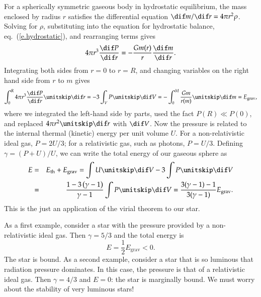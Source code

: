 For a spherically symmetric gaseous body in hydrostatic equilibrium, the mass enclosed by radius $r$ satisfies the differential equation $\dif m/\dif r = 4\pi r^{2}\rho$.  Solving for $\rho$, substituting into the equation for hydrostatic balance, eq.~(\ref{e.hydrostatic}), and rearranging terms gives
\[
4\pi r^{3} \frac{\dif P}{\dif r} = -\frac{Gm(r)}{r} \frac{\dif m}{\dif r}.
\]
Integrating both sides from $r = 0$ to $r = R$, and changing variables on the right hand side from $r$ to $m$ gives
\begin{equation}\label{e.virial-1}
\int_{0}^{R} 4\pi r^{3}\frac{\dif P}{\dif r}\nsp\dif r = -3\int_{V} P\nsp \dif V = -\int_{0}^{M}\frac{Gm}{r(m)}\nsp\dif m = E_{\mathrm{grav}},
\end{equation}
where we integrated the left-hand side by parts, used the fact $P(R) \ll P(0)$, and replaced $4\pi r^{2}\nsp\dif r$ with $\dif V$. Now the pressure is related to the internal thermal (kinetic) energy per unit volume $U$.  For a non-relativistic ideal gas, $P = 2 U/ 3$; for  a relativistic gas, such as photons, $P = U/3$.  Defining $\gamma = (P + U)/U$, we can write the total energy of our gaseous sphere as
\begin{eqnarray}
E &=& E_{\mathrm{th}} + E_{\mathrm{grav}} = \int U \nsp\dif V-3\int P\nsp\dif V \nonumber\\
  &=& \frac{1 -3\left(\gamma - 1\right) }{\gamma - 1} \int P\nsp\dif V = \frac{3(\gamma-1)-1}{3(\gamma-1)} E_{\mathrm{grav}}.
\label{e.total-energy-gas}
\end{eqnarray}
This is the just an application of the virial theorem to our star.

As a first example, consider a star with the pressure provided by a non-relativistic ideal gas. Then $\gamma = 5/3$ and the total energy is 
\[
E = \frac{1}{2}E_{\mathrm{grav}} < 0.
\]
The star is bound.  As a second example, consider a star that is so luminous that radiation pressure dominates. In this case, the pressure is that of a relativistic ideal gas. Then $\gamma = 4/3$ and $E = 0$: the star is marginally bound. We must worry about the stability of very luminous stars!


